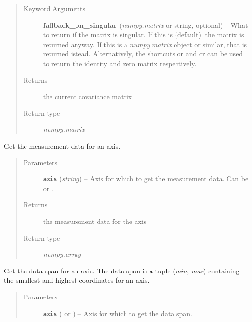 \documentclass[a4paper,10pt,english]{sphinxmanual}
\begin{document}
\begin{fulllineitems}
\begin{fulllineitems}
\begin{quote}
\begin{description}
\item[{Keyword Arguments}] \leavevmode
\textbf{fallback\_on\_singular} (\emph{numpy.matrix} or string, optional) --
What to return if the matrix is singular. If this is 
(default), the matrix is returned anyway. If this is a
\emph{numpy.matrix} object or similar, that is returned istead.
Alternatively, the shortcuts  or  and 
or  can be used to return the identity and zero matrix
respectively.

\item[{Returns}] \leavevmode
the current covariance matrix

\item[{Return type}] \leavevmode
\emph{numpy.matrix}

\end{description}\end{quote}

\end{fulllineitems}


\begin{fulllineitems}
\label{module_doc:kafe.dataset.Dataset.get_data}
Get the measurement data for an axis.
\begin{quote}\begin{description}
\item[{Parameters}] \leavevmode
\textbf{\texttt{axis}} (\emph{string}) -- Axis for which to get the measurement data. Can be  or
.

\item[{Returns}] \leavevmode
the measurement data for the axis

\item[{Return type}] \leavevmode
\emph{numpy.array}

\end{description}\end{quote}

\end{fulllineitems}


\begin{fulllineitems}
\label{module_doc:kafe.dataset.Dataset.get_data_span}
Get the data span for an axis. The data span is a tuple (\emph{min}, \emph{max})
containing the smallest and highest coordinates for an axis.
\begin{quote}\begin{description}
\item[{Parameters}] \leavevmode
\textbf{\texttt{axis}} ( or ) -- Axis for which to get the data span.


\end{description}
\end{quote}
\end{fulllineitems}
\end{fulllineitems}
\end{document}
